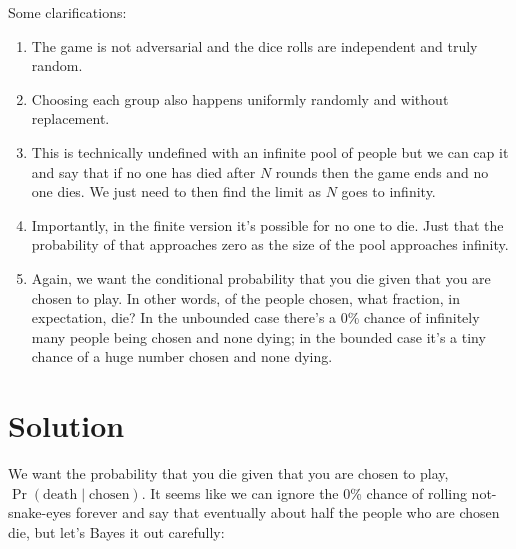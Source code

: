 \documentclass[article,twocolumn]{memoir}
\begin{document}
\newpage

Some clarifications:

\begin{enumerate}
\item The game is not adversarial and the dice rolls are independent and truly random.
\item Choosing each group also happens uniformly randomly and without replacement.
\item This is technically undefined with an infinite pool of people but we can cap it and say that if no one has died after $N$ rounds then the game ends and no one dies. 
We just need to then find the limit as $N$ goes to infinity. 
\item Importantly, in the finite version it's possible for no one to die. 
Just that the probability of that approaches zero as the size of the pool approaches infinity.
\item Again, we want the conditional probability that you die given that you are chosen to play.
In other words, of the people chosen, what fraction, in expectation, die?
In the unbounded case there's a 0\% chance of infinitely many people being chosen and none dying; in the bounded case it's a tiny chance of a huge number chosen and none dying.
\end{enumerate}

%

\newpage

\chapter*{Solution}

We want the probability that you die given that you are chosen to play, 
$\Pr(\text{death} \mid \text{chosen})$.
It seems like we can ignore the 0\% chance of rolling not-snake-eyes forever and say that eventually about half the people who are chosen die, but let's Bayes it out carefully:
\end{document}
